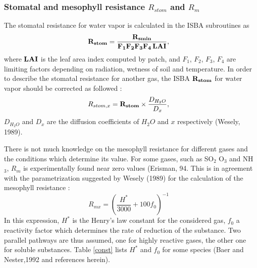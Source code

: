 \subsubsection{Stomatal and mesophyll resistance $R_{stom}$ and $R_m$}

The stomatal resistance for water vapor is calculated in the ISBA subroutines
as \[ \bf{R_{stom}}=\frac{R_{smin}}{F_1 F_2 F_3 F_4\, LAI},\] where
$\bf{LAI}$ is the leaf area index computed by patch, and $F_1$, $F_2$,
$F_3$, $F_4$ are limiting factors depending on 
radiation, wetness of soil and temperature. In order to describe the stomatal
resistance for another gas, the ISBA $\bf{R_{stom}}$ for water vapor should be
corrected as followed :
\[ R_{stom,x}={\bf{R_{stom}}} \times \frac{D_{H_2O}}{D_x},\]
$D_{H_2O}$ and ${D_x}$ are the diffusion coefficients of $H_2O$ and $x$
respectively (Wesely, 1989).

\medskip

There is not much knowledge on the mesophyll resistance for different gases and
the conditions which determine its value. For some gases, such as SO$_2$ %
O$_3$ %
and NH$_3$, %
$R_m$ is experimentally found near zero values (Erisman, 94.
This is in agreement with the parametrization suggested by  Wesely (1989)
for the calculation of the mesophyll resistance :
\[ R_{mx} = ( \frac{H^*}{3000} + 100 f_0) ^{-1} \] 
In this expression, $H^*$ is the Henry's law constant for the considered gas,
$f_0$ a reactivity factor which determines the rate of reduction of the
substance. Two parallel pathways are thus assumed, one for highly reactive
gases, the other one for soluble substances. Table \ref{const} 
lists $H^*$ and
$f_0$ for some species (Baer and Nester,1992 and references herein).


